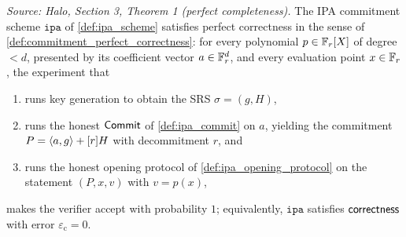 \begin{theorem}
  \label{thm:ipa_correctness}
  \textit{Source: Halo, Section 3, Theorem 1 (perfect completeness).}
  The IPA commitment scheme \(\texttt{ipa}\) of \cref{def:ipa_scheme} satisfies
  perfect correctness in the sense of \cref{def:commitment_perfect_correctness}:
  for every polynomial \(p \in \mathbb{F}_r[X]\) of degree \(< d\), presented by its
  coefficient vector \(a \in \mathbb{F}_r^{d}\), and every evaluation point
  \(x \in \mathbb{F}_r\), the experiment that
  \begin{enumerate}
    \item runs key generation to obtain the SRS \(\sigma = (g, H)\),
    \item runs the honest \(\mathsf{Commit}\) of \cref{def:ipa_commit} on \(a\),
      yielding the commitment \(P = \langle a, g \rangle + [r]H\) with decommitment
      \(r\), and
    \item runs the honest opening protocol of
      \cref{def:ipa_opening_protocol} on the statement
      \((P, x, v)\) with \(v = p(x)\),
  \end{enumerate}
  makes the verifier accept with probability \(1\); equivalently,
  \(\texttt{ipa}\) satisfies \(\mathsf{correctness}\) with error
  \(\varepsilon_{\mathrm{c}} = 0\).
\end{theorem}

